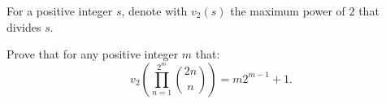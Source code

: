 For a positive integer $s$,  denote with $v_2(s)$ the maximum power of $2$ that divides $s$.

Prove that for any positive integer $m$ that:  $$v_2\left(\prod_{n=1}^{2^m}\binom{2n}{n}\right)=m2^{m-1}+1.$$
